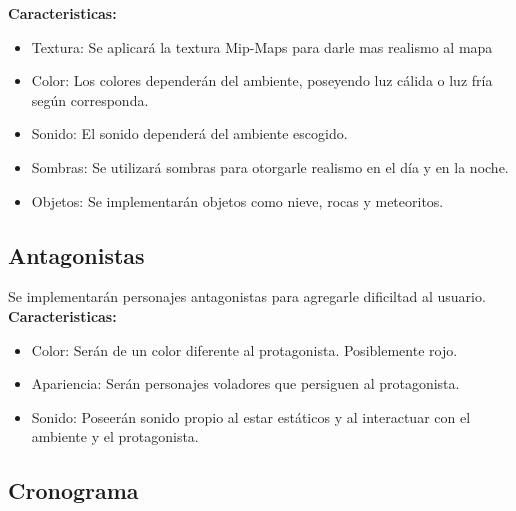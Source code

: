 \documentclass[a4paper]{article}
\begin{document}
\textbf{Caracteristicas:}

\begin{itemize}
	\item Textura: Se aplicará la textura Mip-Maps para darle mas realismo al mapa
	\item Color: Los colores dependerán del ambiente, poseyendo luz cálida o luz fría según corresponda.
	\item Sonido: El sonido dependerá del ambiente escogido.
	\item Sombras: Se utilizará sombras para otorgarle realismo en el día y en la noche.
	\item Objetos: Se implementarán objetos como nieve, rocas y meteoritos.
	
\end{itemize}

\subsection{Antagonistas}
Se implementarán personajes antagonistas para agregarle dificiltad al usuario.\\

\textbf{Caracteristicas:}

\begin{itemize}
	\item Color: Serán de un color diferente al protagonista. Posiblemente rojo.
	\item Apariencia: Serán personajes voladores que persiguen al protagonista.
	\item Sonido: Poseerán sonido propio al estar estáticos y al interactuar con el ambiente y el protagonista.
	
\end{itemize}

\subsection{Cronograma}
\end{document}
